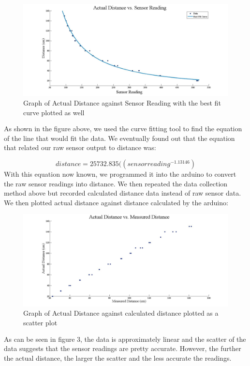 \documentclass{article}
\begin{document}
\begin{figure}[h!]
\begin{center}
\includegraphics[scale=0.3]{ReadingDistance.jpg}
\caption{Graph of Actual Distance against Sensor Reading with the best fit curve plotted as well}
\end{center}
\end{figure}

As shown in the figure above, we used the curve fitting tool to find the equation of the line that would fit the data. We eventually found out that the equation that related our raw sensor output to distance was:

\begin{equation}
distance=25732.835((sensor reading^{-1.13146})
\end{equation}
%
With this equation now known, we programmed it into the arduino to convert the raw sensor readings into distance. We then repeated the data collection method above but recorded calculated distance data instead of raw sensor data. We then plotted actual distance against distance calculated by the arduino:
%
\begin{figure}[h!]
\begin{center}
\includegraphics[scale=0.3]{MeasuredActual.jpg}
\caption{Graph of Actual Distance against calculated distance plotted as a scatter plot}
\end{center}
\end{figure}
%
As can be seen in figure 3, the data is approximately linear and the scatter of the data suggests that the sensor readings are pretty accurate. However, the further the actual distance, the larger the scatter and the less accurate the readings.
\end{document}
